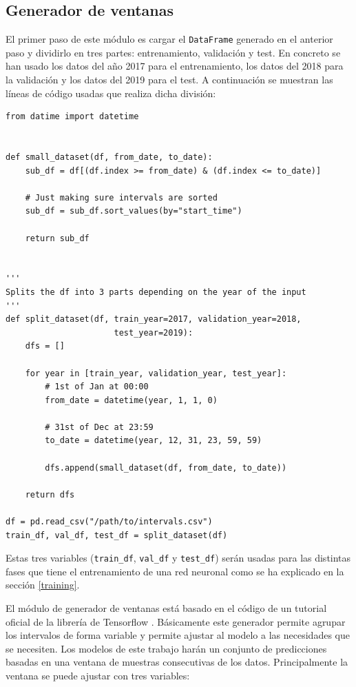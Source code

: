 \subsection{Generador de ventanas}\label{window-generator}

El primer paso de este módulo es cargar el \small{\verb|DataFrame|} generado en el anterior paso y dividirlo en tres partes: entrenamiento, validación y test. En concreto se han usado los datos del año 2017 para el entrenamiento, los datos del 2018 para la validación y los datos del 2019 para el test. A continuación se muestran las líneas de código usadas que realiza dicha división:
\begin{verbatim}
from datime import datetime


def small_dataset(df, from_date, to_date):
    sub_df = df[(df.index >= from_date) & (df.index <= to_date)]
    
    # Just making sure intervals are sorted
    sub_df = sub_df.sort_values(by="start_time") 
    
    return sub_df


'''
Splits the df into 3 parts depending on the year of the input
'''
def split_dataset(df, train_year=2017, validation_year=2018,
                      test_year=2019):
    dfs = []
    
    for year in [train_year, validation_year, test_year]:
        # 1st of Jan at 00:00
        from_date = datetime(year, 1, 1, 0)           
        
        # 31st of Dec at 23:59
        to_date = datetime(year, 12, 31, 23, 59, 59)
        
        dfs.append(small_dataset(df, from_date, to_date))

    return dfs
    
df = pd.read_csv("/path/to/intervals.csv")
train_df, val_df, test_df = split_dataset(df)
\end{verbatim}
Estas tres variables (\small\verb|train_df|, \small\verb|val_df| y \small\verb|test_df|) serán usadas para las distintas fases que tiene el entrenamiento de una red neuronal como se ha explicado en la sección \ref{training}.
\newline

El módulo de generador de ventanas está basado en el código de un tutorial oficial de la librería de Tensorflow \cite{windowgenerator}. Básicamente este generador permite agrupar los intervalos de forma variable y permite ajustar al modelo a las necesidades que se necesiten. Los modelos de este trabajo harán un conjunto de predicciones basadas en una ventana de muestras consecutivas de los datos. Principalmente la ventana se puede ajustar con tres variables:

